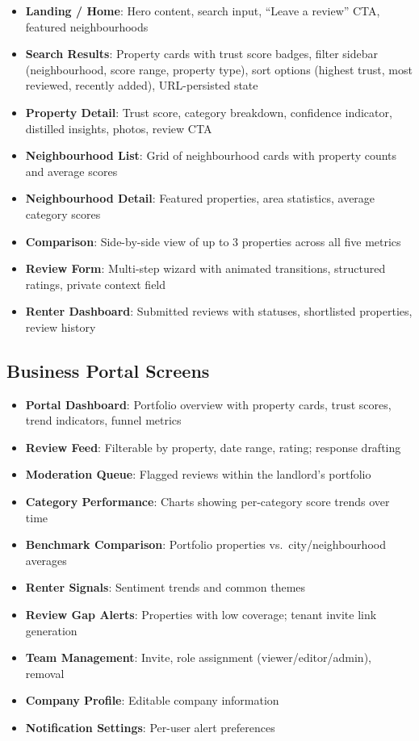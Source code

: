 \documentclass[11pt,letterpaper]{article}
\begin{document}
\begin{itemize}
    \item \textbf{Landing / Home}: Hero content, search input, ``Leave a review'' CTA, featured neighbourhoods
    \item \textbf{Search Results}: Property cards with trust score badges, filter sidebar (neighbourhood, score range, property type), sort options (highest trust, most reviewed, recently added), URL-persisted state
    \item \textbf{Property Detail}: Trust score, category breakdown, confidence indicator, distilled insights, photos, review CTA
    \item \textbf{Neighbourhood List}: Grid of neighbourhood cards with property counts and average scores
    \item \textbf{Neighbourhood Detail}: Featured properties, area statistics, average category scores
    \item \textbf{Comparison}: Side-by-side view of up to 3 properties across all five metrics
    \item \textbf{Review Form}: Multi-step wizard with animated transitions, structured ratings, private context field
    \item \textbf{Renter Dashboard}: Submitted reviews with statuses, shortlisted properties, review history
\end{itemize}

\subsection{Business Portal Screens}

\begin{itemize}
    \item \textbf{Portal Dashboard}: Portfolio overview with property cards, trust scores, trend indicators, funnel metrics
    \item \textbf{Review Feed}: Filterable by property, date range, rating; response drafting
    \item \textbf{Moderation Queue}: Flagged reviews within the landlord's portfolio
    \item \textbf{Category Performance}: Charts showing per-category score trends over time
    \item \textbf{Benchmark Comparison}: Portfolio properties vs.\ city/neighbourhood averages
    \item \textbf{Renter Signals}: Sentiment trends and common themes
    \item \textbf{Review Gap Alerts}: Properties with low coverage; tenant invite link generation
    \item \textbf{Team Management}: Invite, role assignment (viewer/editor/admin), removal
    \item \textbf{Company Profile}: Editable company information
    \item \textbf{Notification Settings}: Per-user alert preferences
\end{itemize}
\end{document}

